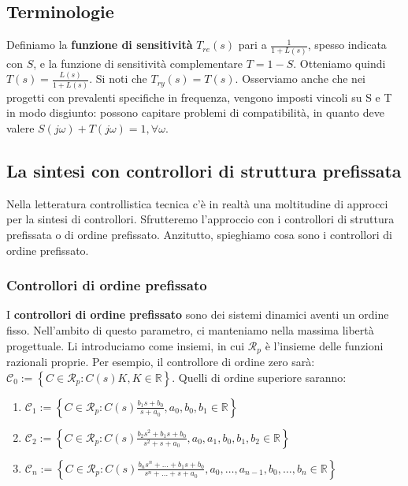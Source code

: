 \documentclass[11pt]{article}
\begin{document}
\subsection{Terminologie}
Definiamo la \textbf{funzione di sensitività} $T_{re}(s)$ pari a $\frac{1}{1+L(s)}$, spesso indicata con $S$, e la funzione di sensitività complementare $T=1-S$. Otteniamo quindi $T(s)=\frac{L(s)}{1+L(s)}$. Si noti che $T_{ry}(s)=T(s)$. 
Osserviamo anche che nei progetti con prevalenti specifiche in frequenza, vengono imposti vincoli su S e T in modo disgiunto: possono capitare problemi di compatibilità, in quanto deve valere $S(j\omega)+T(j\omega) = 1, \forall \omega$. 
\subsection{La sintesi con controllori di struttura prefissata}
Nella letteratura controllistica tecnica c'è in realtà una moltitudine di approcci per la sintesi di controllori. Sfrutteremo l'approccio con i controllori di struttura prefissata o di ordine prefissato. 
Anzitutto, spieghiamo cosa sono i controllori di ordine prefissato.
\subsubsection{Controllori di ordine prefissato}
I \textbf{controllori di ordine prefissato} sono dei sistemi dinamici aventi un ordine fisso. Nell'ambito di questo parametro, ci manteniamo nella massima libertà progettuale. Li introduciamo come insiemi, in cui $\mathcal{R}_p$ è l'insieme delle funzioni razionali proprie. Per esempio, il controllore di ordine zero sarà: $\mathcal{C}_0 :=\left\{C\in\mathcal{R}_p: C(s) K, K\in\mathbb{R}\right\}$.
Quelli di ordine superiore saranno:
\begin{enumerate}
    \item $\mathcal{C}_1 := \left\{C\in\mathcal{R}_p : C(s) \frac{b_1s+b_0}{s+a_0}, a_0, b_0, b_1 \in \mathbb{R}\right\}$
    \item $\mathcal{C}_2 := \left\{C\in\mathcal{R}_p : C(s) \frac{b_2s^2+b_1s+b_0}{s^2+s+a_0}, a_0,a_1, b_0, b_1, b_2 \in \mathbb{R}\right\}$
    \item $\mathcal{C}_n := \left\{C\in\mathcal{R}_p : C(s) \frac{b_ns^n+\dots+b_1s+b_0}{s^n+\dots+s+a_0}, a_0,\dots,a_{n-1}, b_0, \dots, b_n \in \mathbb{R}\right\}$
\end{enumerate}
\end{document}
